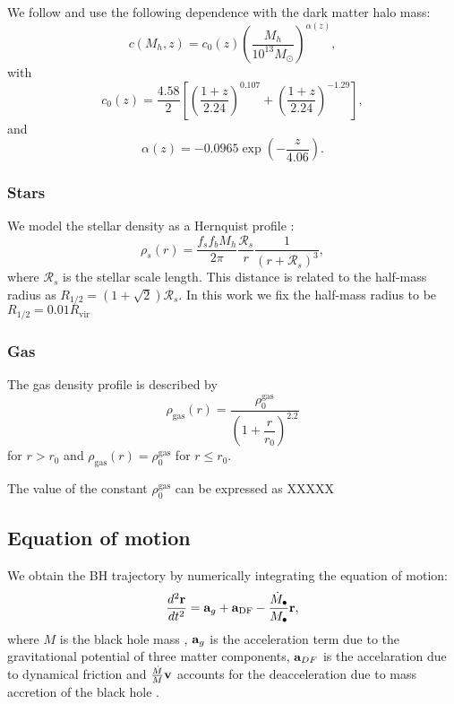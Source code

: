 \documentclass[fleqn,usenatbib]{mnras}
\begin{document}
We follow \cite{choksi2017recoiling} and use the following dependence with the dark matter halo mass:
\begin{equation}
c(M_h, z) = c_0(z)\left(\dfrac{M_h}{10^{13}M_{\odot}}\right)^{\alpha(z)}, 
\end{equation}
%			
with
\begin{equation}
c_0(z) = \dfrac{4.58}{2}\left[\left(\dfrac{1 + z}{2.24}\right)^{0.107} + \left(\dfrac{1 + z}{2.24}\right)^{-1.29}\right],
\end{equation}
and
\begin{equation}
\alpha(z) = -0.0965 \exp\left(-\dfrac{z}{4.06}\right).
\end{equation}

\subsubsection{Stars}

We model the stellar density as a Hernquist profile \citep{hernquist1990analytical}:
\begin{equation}\label{eq: sdensity}
\rho_s(r) = \frac{f_sf_bM_h}{2\pi}\frac{ \mathcal{R}_s}{r}\frac{1}{(r + \mathcal{R}_s)^3},
\end{equation}
where $\mathcal{R}_s$ is the stellar scale length.
This distance is related to the half-mass radius as
 $R_{1/2} = \left(1 + \sqrt{2}\right)\mathcal{R}_s$.
In this work we fix the half-mass radius to be $R_{1/2} = 0.01 R_\text{vir}$ 


\subsubsection{Gas}

The gas density profile is  described by 
\begin{equation}\label{eq: rdensity}
				\rho_\text{gas}(r) = \dfrac{\rho_0^\text{gas}}{\left(1 + \dfrac{r}{r_0}\right)^{2.2}}
\end{equation}
for  $r > r_0$ and  $\rho_\text{gas}(r) = \rho_0^\text{gas}$ for $r\leq r_0$.
		
The value of the constant $\rho_0^\text{gas}$ can be expressed as XXXXX
		
\subsection{Equation of motion}

We obtain the BH trajectory by numerically integrating the equation of motion:
\begin{equation}\label{eq: equationMotion}
	\frac{d ^2{\bf r}}{dt^2}= {\bf a}_g + {\bf a}_{\text{DF}} - \frac{\dot{M}_\bullet}{M_\bullet}{\bf r},
\end{equation}
where $M$ is the black hole mass , ${\bf a}_{g}$ is the acceleration term due to the gravitational potential of three matter components, ${\bf a}_{DF}$ is the accelaration due to dynamical friction and $\frac{\dot{M}}{M} {\bf v}$ accounts for the deacceleration due to mass accretion of the black hole \citep{tanaka2009assembly, choksi2017recoiling}.  
\end{document}
